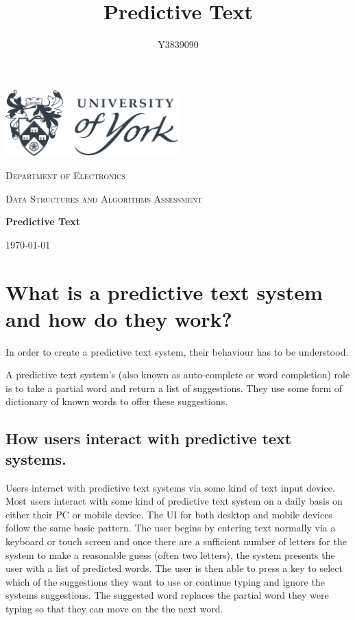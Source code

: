 \documentclass[10pt]{article} %
\title{
	Predictive Text
}
\author{Y3839090}
\begin{document}
    
	\begin{titlepage}
		\centering
		\includegraphics[width=0.5\textwidth]{UoY_logo}\par\vspace{1cm}
		{\scshape\LARGE Department of Electronics \par}
		\vspace{1cm}
		{\scshape\Large Data Structures and Algorithms Assessment \par}
		\vspace{2cm}
		{\huge\bfseries Predictive Text\par}

	
		\vfill
		{\Large\itshape \@author \par}
		\vspace{2cm}
		{\large \today\par}
	\end{titlepage}
	
	
	\tableofcontents
	\newpage
	
	
	\section{What is a predictive text system and how do they work?}
		In order to create a predictive text system, their behaviour has to be understood.
		
		A predictive text system's (also known as  auto-complete or word completion) role is to take a partial word and return a list of suggestions. They use some form of dictionary of known words to offer these suggestions.
		\subsection{How users interact with predictive text systems.}
			Users interact with predictive text systems via some kind of text input device. Most users interact with some kind of predictive text system on a daily basis on either their PC or mobile device. The UI for both desktop and mobile devices follow the same basic pattern. The user begins by entering text normally via a keyboard or touch screen and once there are a sufficient number of letters for the system to make a reasonable guess (often two letters), the system presents the user with a list of predicted words. The user is then able to press a key to select which of the suggestions they want to use or continue typing and ignore the systems suggestions. The suggested word replaces the partial word they were typing so that they can move on the the next word.
\end{document}
